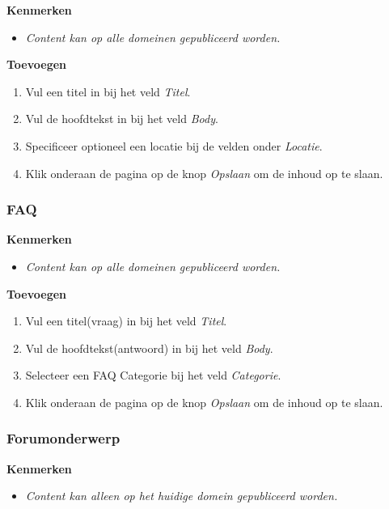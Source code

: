 \textbf{Kenmerken}

\begin{itemize}
\item \emph{Content kan op alle domeinen gepubliceerd worden.}
\end{itemize}

\textbf{Toevoegen}

\begin{enumerate}
\item Vul een titel in bij het veld \emph{Titel}.
\item Vul de hoofdtekst in bij het veld \emph{Body}.
\item Specificeer optioneel een locatie bij de velden onder \emph{Locatie}.
\item Klik onderaan de pagina op de knop \emph{Opslaan} om de inhoud op te slaan.
\end{enumerate}

\subsubsection{FAQ}\label{faq}

\textbf{Kenmerken}

\begin{itemize}
\item \emph{Content kan op alle domeinen gepubliceerd worden.}
\end{itemize}

\textbf{Toevoegen}

\begin{enumerate}
\item Vul een titel(vraag) in bij het veld \emph{Titel}.
\item Vul de hoofdtekst(antwoord) in bij het veld \emph{Body}.
\item Selecteer een FAQ Categorie bij het veld \emph{Categorie}.
\item Klik onderaan de pagina op de knop \emph{Opslaan} om de inhoud op te slaan.
\end{enumerate}

\subsubsection{Forumonderwerp}\label{forumonderwerp}

\textbf{Kenmerken}

\begin{itemize}
\item \emph{Content kan alleen op het huidige domein gepubliceerd worden.}
\end{itemize}

